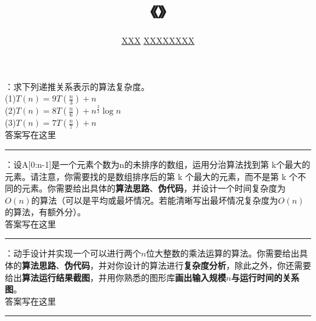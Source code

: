 \documentclass[UTF8,16pt]{article} %
\title{《\heiti{算法设计与分析}》\heiti{第{\color{red}2}次作业}}
\author{\kaishu{姓名：}\underline{XXX} \quad\quad\quad\quad\quad  \kaishu{学号：}\underline{XXXXXXXX}}
\date{}
\begin{document}
	
\maketitle
\vbox{} %


：求下列递推关系表示的算法复杂度。\\
(1)$T(n)=9T(\frac{n}{3}) + n$\\
(2)$T(n)=8T(\frac{n}{6})+n^{\frac{3}{2}}\log n$\\
(3)$T(n)=7T(\frac{n}{7})+n$\\
{}答案写在这里\\
\rule[0pt]{14.3cm}{0.05em}

\vbox{} %
：设A[0:n-1]是一个元素个数为n的未排序的数组，运用分治算法找到第 k个最大的元素。请注意，你需要找的是数组排序后的第 k 个最大的元素，而不是第 k 个不同的元素。你需要给出具体的\textbf{算法思路}、\textbf{伪代码}，并设计一个时间复杂度为$O(n)$的算法（可以是平均或最坏情况。若能清晰写出最坏情况复杂度为$O(n)$的算法，有额外分）。\\
{}答案写在这里\\
\rule[0pt]{14.3cm}{0.05em}

\vbox{} %
：动手设计并实现一个可以进行两个$n$位大整数的乘法运算的算法。你需要给出具体的\textbf{算法思路}、\textbf{伪代码}，并对你设计的算法进行\textbf{复杂度分析}，除此之外，你还需要给出\textbf{算法运行结果截图}，并用你熟悉的图形库\textbf{画出输入规模$n$与运行时间的关系图}。\\
{}答案写在这里\\
\rule[0pt]{14.3cm}{0.05em}



\vbox{} %
\vbox{} %
\end{document}
